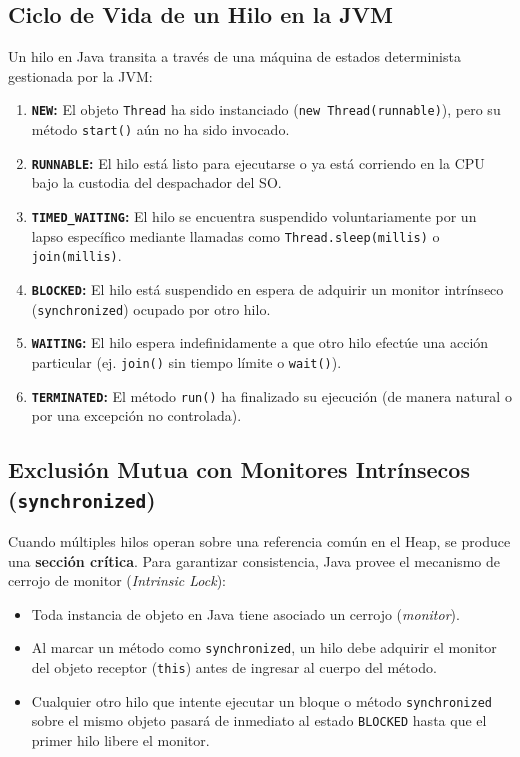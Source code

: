 \documentclass[11pt,letterpaper]{article}
\begin{document}
\subsection{Ciclo de Vida de un Hilo en la JVM}
Un hilo en Java transita a través de una máquina de estados determinista gestionada por la JVM:
\begin{enumerate}
    \item \textbf{\texttt{NEW}:} El objeto \texttt{Thread} ha sido instanciado (\texttt{new Thread(runnable)}), pero su método \texttt{start()} aún no ha sido invocado.
    \item \textbf{\texttt{RUNNABLE}:} El hilo está listo para ejecutarse o ya está corriendo en la CPU bajo la custodia del despachador del SO.
    \item \textbf{\texttt{TIMED\_WAITING}:} El hilo se encuentra suspendido voluntariamente por un lapso específico mediante llamadas como \texttt{Thread.sleep(millis)} o \texttt{join(millis)}.
    \item \textbf{\texttt{BLOCKED}:} El hilo está suspendido en espera de adquirir un monitor intrínseco (\texttt{synchronized}) ocupado por otro hilo.
    \item \textbf{\texttt{WAITING}:} El hilo espera indefinidamente a que otro hilo efectúe una acción particular (ej. \texttt{join()} sin tiempo límite o \texttt{wait()}).
    \item \textbf{\texttt{TERMINATED}:} El método \texttt{run()} ha finalizado su ejecución (de manera natural o por una excepción no controlada).
\end{enumerate}

\subsection{Exclusión Mutua con Monitores Intrínsecos (\texttt{synchronized})}
Cuando múltiples hilos operan sobre una referencia común en el Heap, se produce una \textbf{sección crítica}. Para garantizar consistencia, Java provee el mecanismo de cerrojo de monitor (\textit{Intrinsic Lock}):
\begin{itemize}
    \item Toda instancia de objeto en Java tiene asociado un cerrojo (\textit{monitor}).
    \item Al marcar un método como \texttt{synchronized}, un hilo debe adquirir el monitor del objeto receptor (\texttt{this}) antes de ingresar al cuerpo del método.
    \item Cualquier otro hilo que intente ejecutar un bloque o método \texttt{synchronized} sobre el mismo objeto pasará de inmediato al estado \texttt{BLOCKED} hasta que el primer hilo libere el monitor.
\end{itemize}
\end{document}
